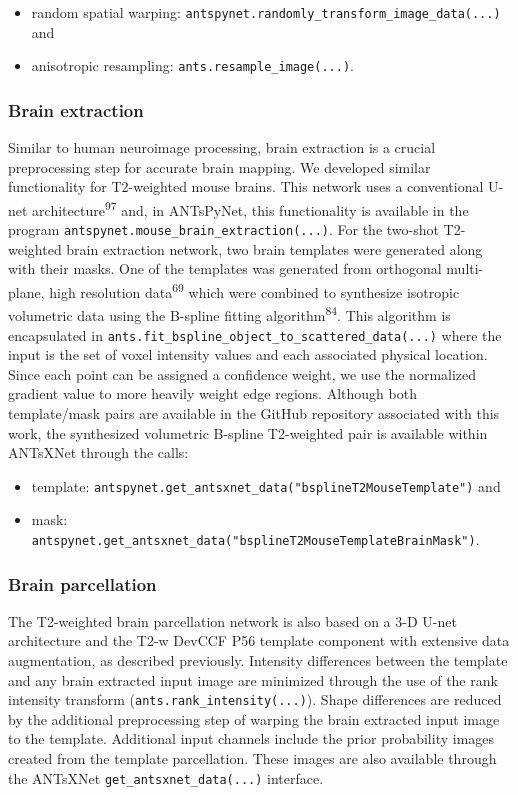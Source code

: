 \documentclass[
  12pt,
]{article}
\begin{document}
\begin{itemize}
\item
  random spatial warping:
  \texttt{antspynet.randomly\_transform\_image\_data(...)} and
\item
  anisotropic resampling: \texttt{ants.resample\_image(...)}.
\end{itemize}

\subsubsection{Brain extraction}\label{brain-extraction}

Similar to human neuroimage processing, brain extraction is a crucial
preprocessing step for accurate brain mapping. We developed similar
functionality for T2-weighted mouse brains. This network uses a
conventional U-net architecture\textsuperscript{97} and, in ANTsPyNet,
this functionality is available in the program
\texttt{antspynet.mouse\_brain\_extraction(...)}. For the two-shot
T2-weighted brain extraction network, two brain templates were generated
along with their masks. One of the templates was generated from
orthogonal multi-plane, high resolution data\textsuperscript{69} which
were combined to synthesize isotropic volumetric data using the B-spline
fitting algorithm\textsuperscript{84}. This algorithm is encapsulated in
\texttt{ants.fit\_bspline\_object\_to\_scattered\_data(...)} where the
input is the set of voxel intensity values and each associated physical
location. Since each point can be assigned a confidence weight, we use
the normalized gradient value to more heavily weight edge regions.
Although both template/mask pairs are available in the GitHub repository
associated with this work, the synthesized volumetric B-spline
T2-weighted pair is available within ANTsXNet through the calls:

\begin{itemize}
\item
  template:
  \texttt{antspynet.get\_antsxnet\_data("bsplineT2MouseTemplate")} and
\item
  mask:
  \texttt{antspynet.get\_antsxnet\_data("bsplineT2MouseTemplateBrainMask")}.
\end{itemize}

\subsubsection{Brain parcellation}\label{brain-parcellation}

The T2-weighted brain parcellation network is also based on a 3-D U-net
architecture and the T2-w DevCCF P56 template component with extensive
data augmentation, as described previously. Intensity differences
between the template and any brain extracted input image are minimized
through the use of the rank intensity transform
(\texttt{ants.rank\_intensity(...)}). Shape differences are reduced by
the additional preprocessing step of warping the brain extracted input
image to the template. Additional input channels include the prior
probability images created from the template parcellation. These images
are also available through the ANTsXNet
\texttt{get\_antsxnet\_data(...)} interface.
\end{document}
